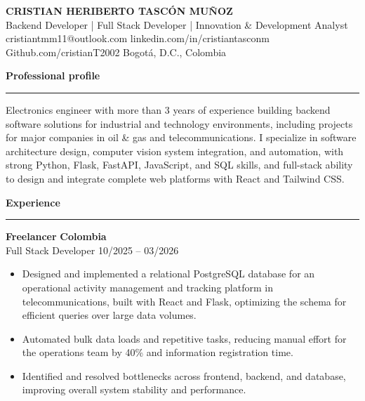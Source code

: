 \documentclass[10pt,a4paper]{article}
\newcommand{\sectionline}[1]{
\vspace{4pt}
\begin{center}
\textbf{\large #1}
\end{center}
\vspace{-1.5mm}
\hrule
\vspace{3pt}
}
\newcommand{\expentry}[4]{
\textbf{#1} \hfill \textbf{#2}\\
#3 \hfill #4
}
\begin{document}
\begin{center}
\begin{tikzpicture}
\end{tikzpicture}

{\LARGE\textbf{CRISTIAN HERIBERTO TASCÓN MUÑOZ}}\\
Backend Developer | Full Stack Developer | Innovation \& Development Analyst\\
cristiantmm11@outlook.com \; \textbullet \;linkedin.com/in/cristiantasconm \; \textbullet Github.com/cristianT2002 \textbullet \; Bogot\'a, D.C., Colombia 
\end{center}

\sectionline{Professional profile}

Electronics engineer with more than 3 years of experience building backend software solutions for industrial and technology environments, including projects for major companies in oil \& gas and telecommunications. I specialize in software architecture design, computer vision system integration, and automation, with strong Python, Flask, FastAPI, JavaScript, and SQL skills, and full-stack ability to design and integrate complete web platforms with React and Tailwind CSS.

\sectionline{Experience}

\expentry{Freelancer}{Colombia}{Full Stack Developer}{10/2025 -- 03/2026}
\begin{itemize}
    \item 
Designed and implemented a relational PostgreSQL database for an operational activity management and tracking platform in telecommunications, built with React and Flask, optimizing the schema for efficient queries over large data volumes.
    \item 
Automated bulk data loads and repetitive tasks, reducing manual effort for the operations team by 40\% and information registration time.
    \item Identified and resolved bottlenecks across frontend, backend, and database, improving overall system stability and performance.

\end{itemize}
\end{document}
